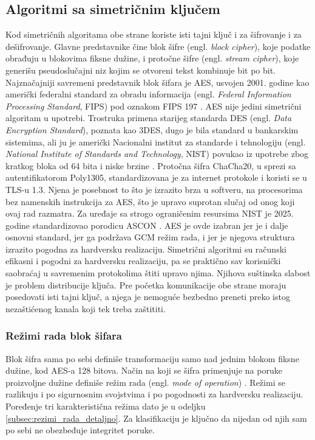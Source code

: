 \subsection{Algoritmi sa simetričnim ključem}
\label{subsec:simetricni}

Kod simetričnih algoritama obe strane koriste isti tajni ključ i za šifrovanje i za dešifrovanje. Glavne predstavnike čine blok šifre (engl. \textit{block cipher}), koje podatke obrađuju u blokovima fiksne dužine, i protočne šifre (engl. \textit{stream cipher}), koje generišu pseudoslučajni niz kojim se otvoreni tekst kombinuje bit po bit. Najznačajniji savremeni predstavnik blok šifara je AES, usvojen 2001. godine kao američki federalni standard za obradu informacija (engl. \textit{Federal Information Processing Standard}, FIPS) pod oznakom FIPS 197 \cite{fips197}.
\smallbreak
AES nije jedini simetrični algoritam u upotrebi. Trostruka primena starijeg standarda DES (engl. \textit{Data Encryption Standard}), poznata kao 3DES, dugo je bila standard u bankarskim sistemima, ali ju je američki Nacionalni institut za standarde i tehnologiju (engl. \textit{National Institute of Standards and Technology}, NIST) povukao iz upotrebe zbog kratkog bloka od 64 bita i niske brzine \cite{sp800131a}. Protočna šifra ChaCha20, u sprezi sa autentifikatorom Poly1305, standardizovana je za internet protokole \cite{rfc8439} i koristi se u TLS-u 1.3. Njena je posebnost to što je izrazito brza u softveru, na procesorima bez namenskih instrukcija za AES, što je upravo suprotan slučaj od onog koji ovaj rad razmatra. Za uređaje sa strogo ograničenim resursima NIST je 2025. godine standardizovao porodicu ASCON \cite{ascon}. AES je ovde izabran jer je i dalje osnovni standard, jer ga podržava GCM režim rada, i jer je njegova struktura izrazito pogodna za hardversku realizaciju.
\smallbreak
Simetrični algoritmi su računski efikasni i pogodni za hardversku realizaciju, pa se praktično sav korisnički saobraćaj u savremenim protokolima štiti upravo njima. Njihova suštinska slabost je problem distribucije ključa. Pre početka komunikacije obe strane moraju posedovati isti tajni ključ, a njega je nemoguće bezbedno preneti preko istog nezaštićenog kanala koji tek treba zaštititi.

\subsubsection{Režimi rada blok šifara}
\label{subsubsec:rezimi_rada}

Blok šifra sama po sebi definiše transformaciju samo nad jednim blokom fiksne dužine, kod AES-a 128 bitova. Način na koji se šifra primenjuje na poruke proizvoljne dužine definiše režim rada (engl. \textit{mode of operation}) \cite{sp80038a}. Režimi se razlikuju i po sigurnosnim svojstvima i po pogodnosti za hardversku realizaciju. Poređenje tri karakteristična režima dato je u odeljku \ref{subsec:rezimi_rada_detaljno}. Za klasifikaciju je ključno da nijedan od njih sam po sebi ne obezbeđuje integritet poruke.

